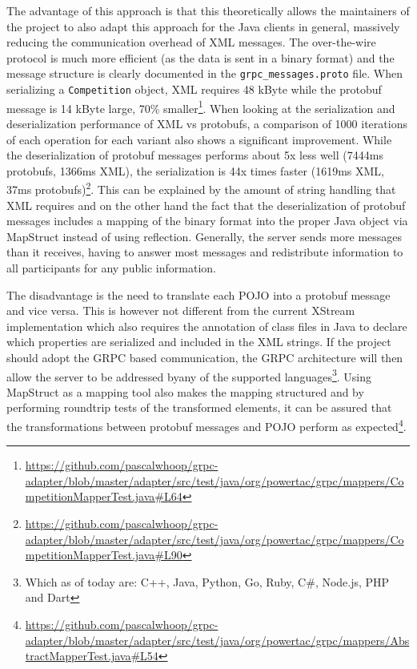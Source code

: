 The advantage of this approach is
that this theoretically allows the maintainers of the project to also adapt this approach for the Java clients in
general, massively reducing the communication overhead of \ac{XML} messages. The over-the-wire protocol is much more
efficient (as the data is sent in a binary format) and the message structure is clearly documented in the
\texttt{grpc\_messages.proto} file. When serializing a \texttt{Competition} object, \ac{XML} requires 48 kByte while
the protobuf message is 14 kByte large, 70\%
smaller\footnote{\url{https://github.com/pascalwhoop/grpc-adapter/blob/master/adapter/src/test/java/org/powertac/grpc/mappers/CompetitionMapperTest.java\#L64}}.
When looking at the serialization and deserialization performance of \ac{XML} vs protobufs, a comparison of 1000
iterations of each operation for each variant also shows a significant improvement. While the deserialization of
protobuf messages performs about 5x less well (7444ms protobufs, 1366ms \ac{XML}), the serialization is 44x times
faster (1619ms \ac{XML}, 37ms
protobufs)\footnote{\url{https://github.com/pascalwhoop/grpc-adapter/blob/master/adapter/src/test/java/org/powertac/grpc/mappers/CompetitionMapperTest.java\#L90}}.
This can be explained by the amount of string handling that \ac{XML} requires and on the other hand the fact that the
deserialization of protobuf messages includes a mapping of the binary format into the proper Java object via MapStruct instead
of using reflection. Generally, the server sends more messages than it receives, having to answer most messages and
redistribute information to all participants for any public information.


The disadvantage is the need to translate each \ac{POJO} into a protobuf message and
vice versa. This is however not different from the current XStream implementation which also requires the annotation of
class files in Java to declare which properties are serialized and included in the \ac{XML} strings. If the project
should adopt the \ac{GRPC} based communication, the \ac{GRPC} architecture will then allow the server to be addressed byany of the supported languages\footnote{Which as of today are: C++, Java, Python, Go, Ruby, C\#, Node.js, PHP and
Dart}. Using MapStruct as a mapping tool also makes the mapping structured and by performing roundtrip tests of the
transformed elements, it can be assured that the transformations between protobuf messages and \ac{POJO} perform as
expected\footnote{\url{https://github.com/pascalwhoop/grpc-adapter/blob/master/adapter/src/test/java/org/powertac/grpc/mappers/AbstractMapperTest.java\#L54}}.



